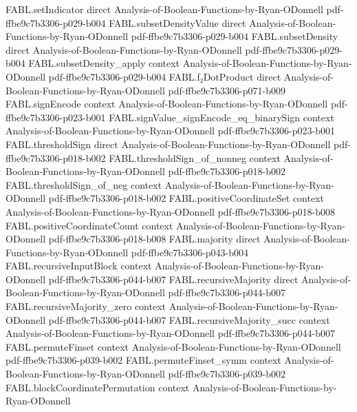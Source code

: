 \begin{theorem}
\proofstep
  {FABL.setIndicator}
  {direct}
  {Analysis-of-Boolean-Functions-by-Ryan-ODonnell}
  {pdf-ffbe9c7b3306-p029-b004}
\proofstep
  {FABL.subsetDensityValue}
  {direct}
  {Analysis-of-Boolean-Functions-by-Ryan-ODonnell}
  {pdf-ffbe9c7b3306-p029-b004}
\proofstep
  {FABL.subsetDensity}
  {direct}
  {Analysis-of-Boolean-Functions-by-Ryan-ODonnell}
  {pdf-ffbe9c7b3306-p029-b004}
\proofstep
  {FABL.subsetDensity_apply}
  {context}
  {Analysis-of-Boolean-Functions-by-Ryan-ODonnell}
  {pdf-ffbe9c7b3306-p029-b004}
\proofstep
  {FABL.f₂DotProduct}
  {direct}
  {Analysis-of-Boolean-Functions-by-Ryan-ODonnell}
  {pdf-ffbe9c7b3306-p071-b009}
\proofstep
  {FABL.signEncode}
  {context}
  {Analysis-of-Boolean-Functions-by-Ryan-ODonnell}
  {pdf-ffbe9c7b3306-p023-b001}
\proofstep
  {FABL.signValue_signEncode_eq_binarySign}
  {context}
  {Analysis-of-Boolean-Functions-by-Ryan-ODonnell}
  {pdf-ffbe9c7b3306-p023-b001}
\proofstep
  {FABL.thresholdSign}
  {direct}
  {Analysis-of-Boolean-Functions-by-Ryan-ODonnell}
  {pdf-ffbe9c7b3306-p018-b002}
\proofstep
  {FABL.thresholdSign_of_nonneg}
  {context}
  {Analysis-of-Boolean-Functions-by-Ryan-ODonnell}
  {pdf-ffbe9c7b3306-p018-b002}
\proofstep
  {FABL.thresholdSign_of_neg}
  {context}
  {Analysis-of-Boolean-Functions-by-Ryan-ODonnell}
  {pdf-ffbe9c7b3306-p018-b002}
\proofstep
  {FABL.positiveCoordinateSet}
  {context}
  {Analysis-of-Boolean-Functions-by-Ryan-ODonnell}
  {pdf-ffbe9c7b3306-p018-b008}
\proofstep
  {FABL.positiveCoordinateCount}
  {context}
  {Analysis-of-Boolean-Functions-by-Ryan-ODonnell}
  {pdf-ffbe9c7b3306-p018-b008}
\proofstep
  {FABL.majority}
  {direct}
  {Analysis-of-Boolean-Functions-by-Ryan-ODonnell}
  {pdf-ffbe9c7b3306-p043-b004}
\proofstep
  {FABL.recursiveInputBlock}
  {context}
  {Analysis-of-Boolean-Functions-by-Ryan-ODonnell}
  {pdf-ffbe9c7b3306-p044-b007}
\proofstep
  {FABL.recursiveMajority}
  {direct}
  {Analysis-of-Boolean-Functions-by-Ryan-ODonnell}
  {pdf-ffbe9c7b3306-p044-b007}
\proofstep
  {FABL.recursiveMajority_zero}
  {context}
  {Analysis-of-Boolean-Functions-by-Ryan-ODonnell}
  {pdf-ffbe9c7b3306-p044-b007}
\proofstep
  {FABL.recursiveMajority_succ}
  {context}
  {Analysis-of-Boolean-Functions-by-Ryan-ODonnell}
  {pdf-ffbe9c7b3306-p044-b007}
\proofstep
  {FABL.permuteFinset}
  {context}
  {Analysis-of-Boolean-Functions-by-Ryan-ODonnell}
  {pdf-ffbe9c7b3306-p039-b002}
\proofstep
  {FABL.permuteFinset_symm}
  {context}
  {Analysis-of-Boolean-Functions-by-Ryan-ODonnell}
  {pdf-ffbe9c7b3306-p039-b002}
\proofstep
  {FABL.blockCoordinatePermutation}
  {context}
  {Analysis-of-Boolean-Functions-by-Ryan-ODonnell}

\end{theorem}

